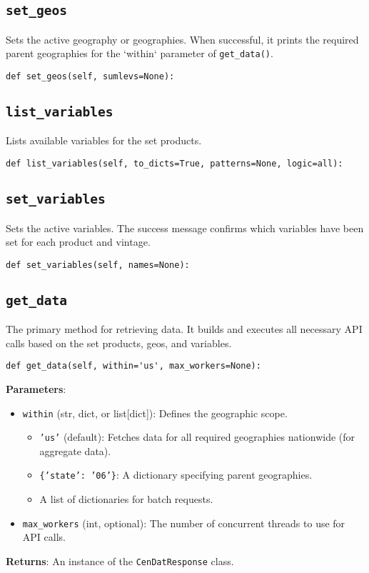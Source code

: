 \documentclass{article}
\begin{document}
\subsection{\texttt{set\_geos}}
Sets the active geography or geographies. When successful, it prints the required parent geographies for the `within` parameter of \texttt{get\_data()}.
\begin{verbatim}
def set_geos(self, sumlevs=None):
\end{verbatim}

\subsection{\texttt{list\_variables}}
Lists available variables for the set products.
\begin{verbatim}
def list_variables(self, to_dicts=True, patterns=None, logic=all):
\end{verbatim}

\subsection{\texttt{set\_variables}}
Sets the active variables. The success message confirms which variables have been set for each product and vintage.
\begin{verbatim}
def set_variables(self, names=None):
\end{verbatim}

\subsection{\texttt{get\_data}}
The primary method for retrieving data. It builds and executes all necessary API calls based on the set products, geos, and variables.
\begin{verbatim}
def get_data(self, within='us', max_workers=None):
\end{verbatim}
\textbf{Parameters}:
\begin{itemize}
    \item \texttt{within} (str, dict, or list[dict]): Defines the geographic scope.
    \begin{itemize}
        \item \texttt{'us'} (default): Fetches data for all required geographies nationwide (for aggregate data).
        \item \texttt{\{'state': '06'\}}: A dictionary specifying parent geographies.
        \item A list of dictionaries for batch requests.
    \end{itemize}
    \item \texttt{max\_workers} (int, optional): The number of concurrent threads to use for API calls.
\end{itemize}
\textbf{Returns}: An instance of the \texttt{CenDatResponse} class.
\end{document}
